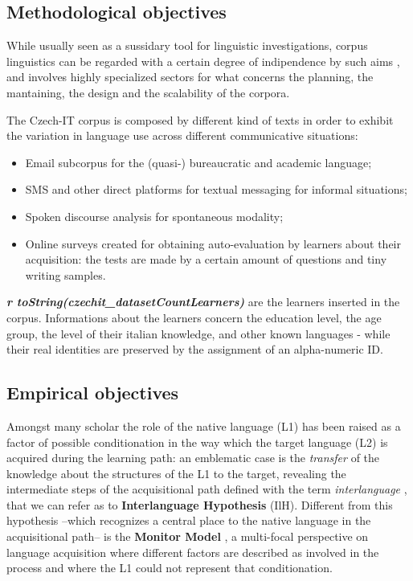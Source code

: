 \documentclass[
  a4paper,
  twoside,
  12pt,
  chapterprefix=false,
  bibliography=totocnumbered,
  listof=flat]{scrbook}
\providecommand{\tightlist}{%
  \setlength{\itemsep}{0pt}\setlength{\parskip}{0pt}}
\begin{document}
\hypertarget{methodological-objectives}{%
\subsection{Methodological objectives}\label{methodological-objectives}}

While usually seen as a sussidary tool for linguistic investigations, corpus linguistics can be regarded with a certain degree of indipendence by such aims \citep{sinclair2005, sinclairCarter2004}, and involves highly specialized sectors for what concerns the planning, the mantaining, the design and the scalability of the corpora.

The Czech-IT corpus is composed by different kind of texts in order to exhibit the variation in language use across different communicative situations:

\begin{itemize}
\tightlist
\item
  Email subcorpus for the (quasi-) bureaucratic and academic language;
\item
  SMS and other direct platforms for textual messaging for informal situations;
\item
  Spoken discourse analysis for spontaneous modality;
\item
  Online surveys created for obtaining auto-evaluation by learners about their acquisition: the tests are made by a certain amount of questions and tiny writing samples.
\end{itemize}

\textbf{\emph{r toString(czechit\_datasetCountLearners)}} are the learners inserted in the corpus. Informations about the learners concern the education level, the age group, the level of their italian knowledge, and other known languages - while their real identities are preserved by the assignment of an alpha-numeric ID.

\hypertarget{empirical-objectives}{%
\subsection{Empirical objectives}\label{empirical-objectives}}

Amongst many scholar the role of the native language (L1) has been raised as a factor of possible conditionation in the way which the target language (L2) is acquired during the learning path: an emblematic case is the \emph{transfer} of the knowledge about the structures of the L1 to the target, revealing the intermediate steps of the acquisitional path defined with the term \emph{interlanguage} \citep{selinker1972}, that we can refer as to \textbf{Interlanguage Hypothesis} (IlH). Different from this hypothesis --which recognizes a central place to the native language in the acquisitional path-- is the \textbf{Monitor Model} \citep{krashen1981}, a multi-focal perspective on language acquisition where different factors are described as involved in the process and where the L1 could not represent that conditionation.
\end{document}
